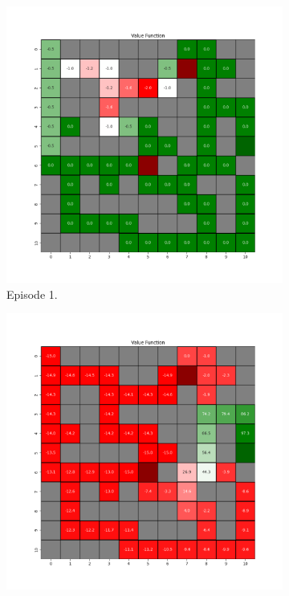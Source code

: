 \documentclass{assignment}
\begin{document}
\begin{figure}[H]
    \begin{subfigure}{0.3\textwidth}
        \includegraphics[width=\textwidth]{figures/value_q/alpha_sweep/value_function_alpha_0.5_gamma_0.95_epsilon_0.2_iteration_1.png}
    \caption{Episode 1.}
    \end{subfigure}\hfill
    \begin{subfigure}{0.3\textwidth}
        \includegraphics[width=\textwidth]{figures/value_q/alpha_sweep/value_function_alpha_0.5_gamma_0.95_epsilon_0.2_iteration_50.png}

\end{subfigure}
\end{figure}
\end{document}
